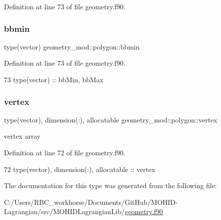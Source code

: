 Definition at line 73 of file geometry.\+f90.

\mbox{\label{structgeometry__mod_1_1polygon_a962e69bdf4fc506d07445927f9f45776}} 
\subsubsection{\texorpdfstring{bbmin}{bbmin}}
{\footnotesize\ttfamily type(vector) geometry\+\_\+mod\+::polygon\+::bbmin\hspace{0.3cm}{\ttfamily [private]}}



Definition at line 73 of file geometry.\+f90.


\begin{DoxyCode}
73         \textcolor{keywordtype}{type}(vector) :: bbMin, bbMax
\end{DoxyCode}
\mbox{\label{structgeometry__mod_1_1polygon_a8842e1792a26fbc0a8ab2ad252d07998}} 
\subsubsection{\texorpdfstring{vertex}{vertex}}
{\footnotesize\ttfamily type(vector), dimension(\+:), allocatable geometry\+\_\+mod\+::polygon\+::vertex\hspace{0.3cm}{\ttfamily [private]}}



vertex array 



Definition at line 72 of file geometry.\+f90.


\begin{DoxyCode}
72         \textcolor{keywordtype}{type}(vector), \textcolor{keywordtype}{dimension(:)}, \textcolor{keywordtype}{allocatable} :: vertex
\end{DoxyCode}


The documentation for this type was generated from the following file\+:\begin{DoxyCompactItemize}
\item 
C\+:/\+Users/\+R\+B\+C\+\_\+workhorse/\+Documents/\+Git\+Hub/\+M\+O\+H\+I\+D-\/\+Lagrangian/src/\+M\+O\+H\+I\+D\+Lagrangian\+Lib/\mbox{\hyperlink{geometry_8f90}{geometry.\+f90}}\end{DoxyCompactItemize}
